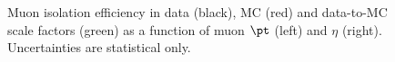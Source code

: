 \begin{figure}[htbp!]
  \begin{center}
      \caption{Muon isolation efficiency in data (black), MC (red) and data-to-MC
        scale factors (green) as a function of muon $\pt$ (left) and $\eta$ (right). Uncertainties are statistical only.}
\label{fig:muonEff_Iso}
  \end{center}
\end{figure}


